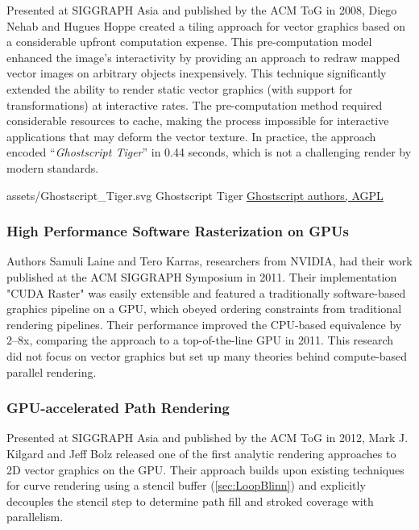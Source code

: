 Presented at SIGGRAPH Asia and published by the ACM ToG in 2008, Diego Nehab and Hugues Hoppe created a tiling approach for vector graphics based on a considerable upfront computation expense. This pre-computation model enhanced the image's interactivity by providing an approach to redraw mapped vector images on arbitrary objects inexpensively. This technique significantly extended the ability to render static vector graphics (with support for transformations) at interactive rates. The pre-computation method required considerable resources to cache, making the process impossible for interactive applications that may deform the vector texture. In practice, the approach encoded ``\textit{Ghostscript Tiger}'' in 0.44 seconds\cite{Nehab08}, which is not a challenging render by modern standards.\medskip

\smallsvg
{assets/Ghostscript_Tiger.svg}
{Ghostscript Tiger}
{\href{http://www.gnu.org/licenses/agpl.html}{Ghostscript authors, AGPL}}\medskip

\subsubsection{High Performance Software Rasterization on GPUs}\cite{Laine11}
Authors Samuli Laine and Tero Karras, researchers from NVIDIA, had their work published at the ACM SIGGRAPH Symposium in 2011. Their implementation "CUDA Raster" was easily extensible and featured a traditionally software-based graphics pipeline on a GPU, which obeyed ordering constraints from traditional rendering pipelines. Their performance improved the CPU-based equivalence by 2–8x, comparing the approach to a top-of-the-line GPU in 2011. This research did not focus on vector graphics but set up many theories behind compute-based parallel rendering.

\subsubsection{GPU-accelerated Path Rendering}\cite{Kilgard12}
Presented at SIGGRAPH Asia and published by the ACM ToG in 2012, Mark J. Kilgard and Jeff Bolz released one of the first analytic rendering approaches to 2D vector graphics on the GPU. Their approach builds upon existing techniques for curve rendering using a stencil buffer (\cref{sec:LoopBlinn}) and explicitly decouples the stencil step to determine path fill and stroked coverage with parallelism.

